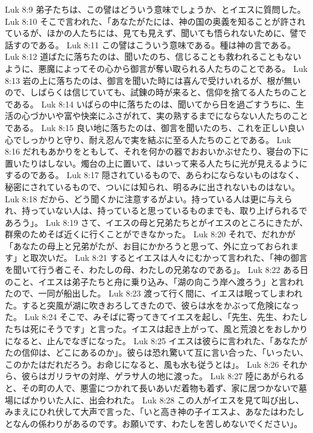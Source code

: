Luk 8:9  弟子たちは、この譬はどういう意味でしょうか、とイエスに質問した。
Luk 8:10  そこで言われた、「あなたがたには、神の国の奥義を知ることが許されているが、ほかの人たちには、見ても見えず、聞いても悟られないために、譬で話すのである。
Luk 8:11  この譬はこういう意味である。種は神の言である。
Luk 8:12  道ばたに落ちたのは、聞いたのち、信じることも救われることもないように、悪魔によってその心から御言が奪い取られる人たちのことである。
Luk 8:13  岩の上に落ちたのは、御言を聞いた時には喜んで受けいれるが、根が無いので、しばらくは信じていても、試錬の時が来ると、信仰を捨てる人たちのことである。
Luk 8:14  いばらの中に落ちたのは、聞いてから日を過ごすうちに、生活の心づかいや富や快楽にふさがれて、実の熟するまでにならない人たちのことである。
Luk 8:15  良い地に落ちたのは、御言を聞いたのち、これを正しい良い心でしっかりと守り、耐え忍んで実を結ぶに至る人たちのことである。
Luk 8:16  だれもあかりをともして、それを何かの器でおおいかぶせたり、寝台の下に置いたりはしない。燭台の上に置いて、はいって来る人たちに光が見えるようにするのである。
Luk 8:17  隠されているもので、あらわにならないものはなく、秘密にされているもので、ついには知られ、明るみに出されないものはない。
Luk 8:18  だから、どう聞くかに注意するがよい。持っている人は更に与えられ、持っていない人は、持っていると思っているものまでも、取り上げられるであろう」。
Luk 8:19  さて、イエスの母と兄弟たちとがイエスのところにきたが、群衆のためそば近くに行くことができなかった。
Luk 8:20  それで、だれかが「あなたの母上と兄弟がたが、お目にかかろうと思って、外に立っておられます」と取次いだ。
Luk 8:21  するとイエスは人々にむかって言われた、「神の御言を聞いて行う者こそ、わたしの母、わたしの兄弟なのである」。
Luk 8:22  ある日のこと、イエスは弟子たちと舟に乗り込み、「湖の向こう岸へ渡ろう」と言われたので、一同が船出した。
Luk 8:23  渡って行く間に、イエスは眠ってしまわれた。すると突風が湖に吹きおろしてきたので、彼らは水をかぶって危険になった。
Luk 8:24  そこで、みそばに寄ってきてイエスを起し、「先生、先生、わたしたちは死にそうです」と言った。イエスは起き上がって、風と荒浪とをおしかりになると、止んでなぎになった。
Luk 8:25  イエスは彼らに言われた、「あなたがたの信仰は、どこにあるのか」。彼らは恐れ驚いて互に言い合った、「いったい、このかたはだれだろう。お命じになると、風も水も従うとは」。
Luk 8:26  それから、彼らはガリラヤの対岸、ゲラサ人の地に渡った。
Luk 8:27  陸にあがられると、その町の人で、悪霊につかれて長いあいだ着物も着ず、家に居つかないで墓場にばかりいた人に、出会われた。
Luk 8:28  この人がイエスを見て叫び出し、みまえにひれ伏して大声で言った、「いと高き神の子イエスよ、あなたはわたしとなんの係わりがあるのです。お願いです、わたしを苦しめないでください」。
